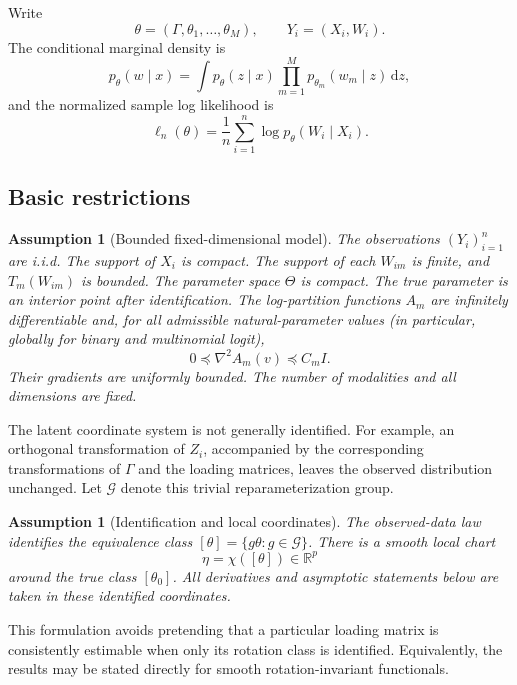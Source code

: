 \documentclass[11pt]{article}
\newtheorem{assumption}[theorem]{Assumption}
\theoremstyle{definition}
\newcommand{\R}{\mathbb R}
\newcommand{\dd}{\,\mathrm d}
\newcommand{\cG}{\mathcal G}
\begin{document}
Write
\[
\theta=(\Gamma,\theta_1,\ldots,\theta_M),
\qquad
Y_i=(X_i,W_i).
\]
The conditional marginal density is
\begin{equation}
p_\theta(w\mid x)
=
\int p_\theta(z\mid x)
\prod_{m=1}^M p_{\theta_m}(w_m\mid z)\dd z,
\label{eq:marginal}
\end{equation}
and the normalized sample log likelihood is
\begin{equation}
\ell_n(\theta)
=
\frac1n\sum_{i=1}^n\log p_\theta(W_i\mid X_i).
\label{eq:loglik}
\end{equation}

\subsection{Basic restrictions}

\begin{assumption}[Bounded fixed-dimensional model]
\label{ass:model}
The observations $(Y_i)_{i=1}^n$ are i.i.d. The support of $X_i$ is compact. The support of each $W_{im}$ is finite, and $T_m(W_{im})$ is bounded. The parameter space $\Theta$ is compact. The true parameter is an interior point after identification. The log-partition functions $A_m$ are infinitely differentiable and, for all admissible natural-parameter values (in particular, globally for binary and multinomial logit),
\[
0\preceq \nabla^2 A_m(v)\preceq C_m I.
\]
Their gradients are uniformly bounded. The number of modalities and all dimensions are fixed.
\end{assumption}

The latent coordinate system is not generally identified. For example, an orthogonal transformation of $Z_i$, accompanied by the corresponding transformations of $\Gamma$ and the loading matrices, leaves the observed distribution unchanged. Let $\cG$ denote this trivial reparameterization group.

\begin{assumption}[Identification and local coordinates]
\label{ass:id}
The observed-data law identifies the equivalence class $[\theta]=\{g\theta:g\in\cG\}$. There is a smooth local chart
\[
\eta=\chi([\theta])\in\R^p
\]
around the true class $[\theta_0]$. All derivatives and asymptotic statements below are taken in these identified coordinates.
\end{assumption}

This formulation avoids pretending that a particular loading matrix is consistently estimable when only its rotation class is identified. Equivalently, the results may be stated directly for smooth rotation-invariant functionals.
\end{document}
